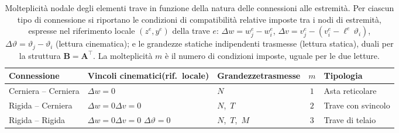 \begin{table}[htbp]
	\centering
	\small
	\renewcommand{\arraystretch}{1.6}
	\begin{tabular}{p{3.0cm}p{2.4cm}p{2.4cm}cp{2.4cm}}
		\toprule
		\textbf{Connessione} &
		\textbf{Vincoli cinematici}\newline\textbf{(rif.\ locale)}&
		\textbf{Grandezze}\newline\textbf{trasmesse} &
		$m$ &
		\textbf{Tipologia} \\
		\midrule
		Cerniera -- Cerniera
		& $\Delta w = 0$
		& $N$
		& $1$
		& Asta reticolare \\
		Rigida -- Cerniera
		& $\Delta w = 0$\newline $\Delta v = 0$
		& $N$,\ $T$
		& $2$
		& Trave con svincolo \\
		Rigida -- Rigida
		& $\Delta w = 0$\newline $\Delta v = 0$\newline
		$\Delta\vartheta = 0$
		& $N$,\ $T$,\ $M$
		& $3$
		& Trave di telaio \\
		\bottomrule
	\end{tabular}
	\caption{Molteplicità nodale degli elementi trave
		in funzione della natura delle connessioni
		alle estremità. Per ciascun tipo di connessione
		si riportano le condizioni di compatibilità
		relative imposte tra i nodi di estremità,
		espresse nel riferimento locale $(z^e, y^e)$
		della trave $e$: $\Delta w = w_j^e - w_i^e$,
		$\Delta v = v_j^e - (v_i^e - \ell^e\,\vartheta_i)$,
		$\Delta\vartheta = \vartheta_j - \vartheta_i$
		(lettura cinematica); e le grandezze statiche
		indipendenti trasmesse (lettura statica),
		duali per la struttura $\bm{B} = \bm{A}^\top$.
		La molteplicità $m$ è il numero di condizioni
		imposte, uguale per le due letture.}
	\label{tab:molt_nodale}
\end{table}

